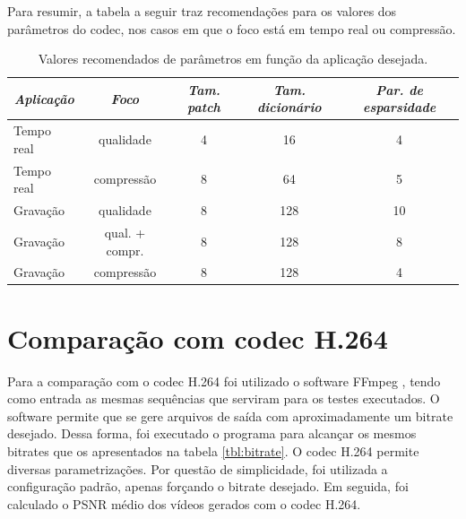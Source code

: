 \documentclass[cic,tc]{iiufrgs}
\begin{document}
Para resumir, a tabela a seguir traz recomendações para os valores dos parâmetros do codec, 
nos casos em que o foco está em tempo real ou compressão.

\begin{table}
    \caption{Valores recomendados de parâmetros em função da aplicação desejada.}
    \centering
    \begin{tabular}{|l|c|c|c|c|}
        \hline
        \multicolumn{1}{|c|}{\emph{Aplicação}} & 
        \emph{Foco} & 
        \emph{Tam. patch} & 
        \emph{Tam. dicionário} & 
        \emph{Par. de esparsidade} \\
        \hline
        Tempo real & qualidade & 4 & 16 & 4 \\
        Tempo real & compressão & 8 & 64 & 5 \\
        Gravação & qualidade & 8 & 128 & 10 \\
        Gravação & qual. + compr. & 8 & 128 & 8 \\
        Gravação & compressão & 8 & 128 & 4 \\
        \hline
    \end{tabular}
\end{table}

\section{Comparação com codec H.264}
Para a comparação com o codec H.264 foi utilizado o software FFmpeg \cite{FFmpeg}, tendo como entrada
as mesmas sequências que serviram para os testes executados. 
O software permite que se gere arquivos de saída com aproximadamente um bitrate desejado.
Dessa forma, foi executado o programa para alcançar os mesmos bitrates que os apresentados 
na tabela \ref{tbl:bitrate}.
O codec H.264 permite diversas parametrizações.
Por questão de simplicidade, foi utilizada a configuração padrão, apenas forçando o bitrate desejado.
Em seguida, foi calculado o PSNR médio dos vídeos gerados com o codec H.264.
\end{document}
